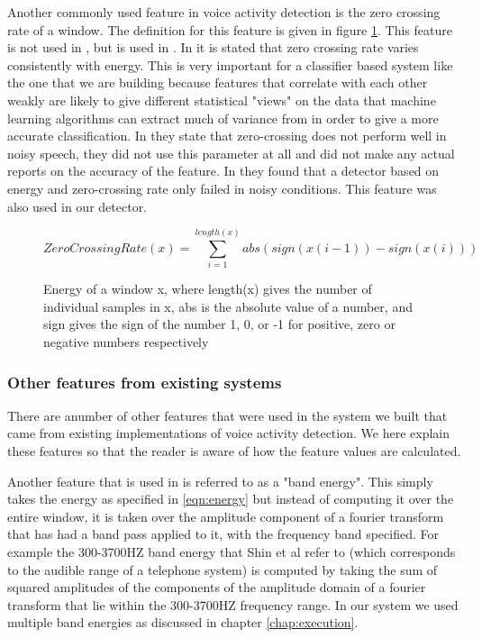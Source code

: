 \documentclass[ %
                    author={Sam Phippen},
                supervisor={Dr. Rafal Bogacz},
                     title={Real time voice activity detectors in noisy personal computing environments},
                  subtitle={},
                    degree={MEng},
                      year={2012} ]{thesis}
\begin{document}
Another commonly used feature in voice activity detection is the zero crossing
rate of a window. The definition for this feature is given in figure
\ref{eqn:zero-crossing-rate}. This feature is not used in \cite{shin}, but is
used in \cite{atal}. In \cite{atal} it is stated that zero crossing rate varies
consistently with energy. This is very important for a classifier based system
like the one that we are building because features that correlate with each
other weakly are likely to give different statistical "views" on the data that
machine learning algorithms can extract much of variance from in order to give
a more accurate classification. In \cite{shin} they state that zero-crossing
does not perform well in noisy speech, they did not use this parameter at all
and did not make any actual reports on the accuracy of the feature. In
\cite{haigh} they found that a detector based on energy and zero-crossing rate
only failed in noisy conditions. This feature was also used in our detector.

\begin{figure} $$ZeroCrossingRate(x) =
    \sum_{i=1}^{length(x)}abs(sign(x(i-1))-sign(x(i)))$$ \label{eqn:zero-crossing-rate}
    \caption{Energy of a window x, where length(x) gives the number of
    individual samples in x, abs is the absolute value of a number, and sign
gives the sign of the number 1, 0, or -1 for positive, zero or negative numbers
respectively} \end{figure}

\subsubsection{Other features from existing systems}

There are anumber of other features that were used in the system we built that
came from existing implementations of voice activity detection. We here explain
these features so that the reader is aware of how the feature values are
calculated.

Another feature that is used in \cite{shin} is referred to as a "band energy".
This simply takes the energy as specified in \ref{eqn:energy} but instead of
computing it over the entire window, it is taken over the amplitude component
of a fourier transform that has had a band pass applied to it, with the
frequency band specified. For example the 300-3700HZ band energy that Shin et
al refer to (which corresponds to the audible range of a telephone system) is
computed by taking the sum of squared amplitudes of the components of the
amplitude domain of a fourier transform that lie within the 300-3700HZ
frequency range. In our system we used multiple band energies as discussed in
chapter \ref{chap:execution}.
\end{document}
